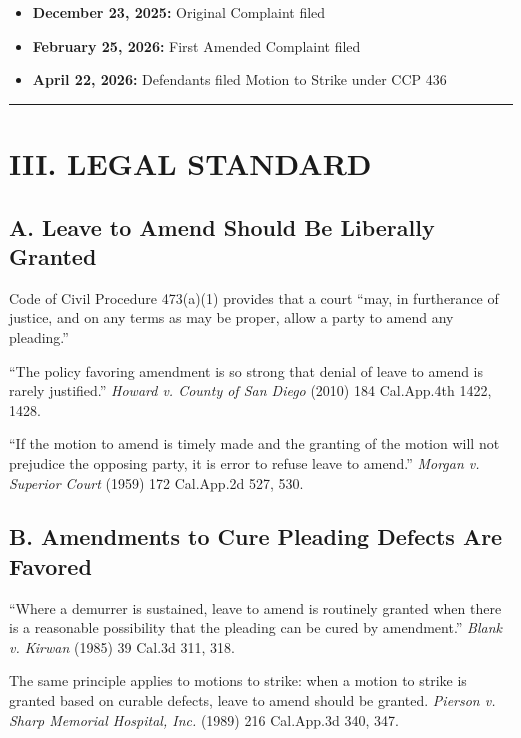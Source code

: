 \begin{itemize}
\tightlist
\item
  \textbf{December 23, 2025:} Original Complaint filed
\item
  \textbf{February 25, 2026:} First Amended Complaint filed
\item
  \textbf{April 22, 2026:} Defendants filed Motion to Strike under CCP \textsection{} 436
\end{itemize}

\begin{center}\rule{0.5\linewidth}{0.5pt}\end{center}

\label{toc:iii-legal-standard}
\section{III. LEGAL STANDARD}\label{iii.-legal-standard}

\subsection{A. Leave to Amend Should Be Liberally Granted}\label{a.-leave-to-amend-should-be-liberally-granted}

Code of Civil Procedure \textsection{} 473(a)(1) provides that a court ``may, in furtherance of justice, and on any terms as may be proper, allow a party to amend any pleading.''

``The policy favoring amendment is so strong that denial of leave to amend is rarely justified.'' \emph{Howard v. County of San Diego} (2010) 184 Cal.App.4th 1422, 1428.

``If the motion to amend is timely made and the granting of the motion will not prejudice the opposing party, it is error to refuse leave to amend.'' \emph{Morgan v. Superior Court} (1959) 172 Cal.App.2d 527, 530.

\subsection{B. Amendments to Cure Pleading Defects Are Favored}\label{b.-amendments-to-cure-pleading-defects-are-favored}

``Where a demurrer is sustained, leave to amend is routinely granted when there is a reasonable possibility that the pleading can be cured by amendment.'' \emph{Blank v. Kirwan} (1985) 39 Cal.3d 311, 318.

The same principle applies to motions to strike: when a motion to strike is granted based on curable defects, leave to amend should be granted. \emph{Pierson v. Sharp Memorial Hospital, Inc.} (1989) 216 Cal.App.3d 340, 347.


